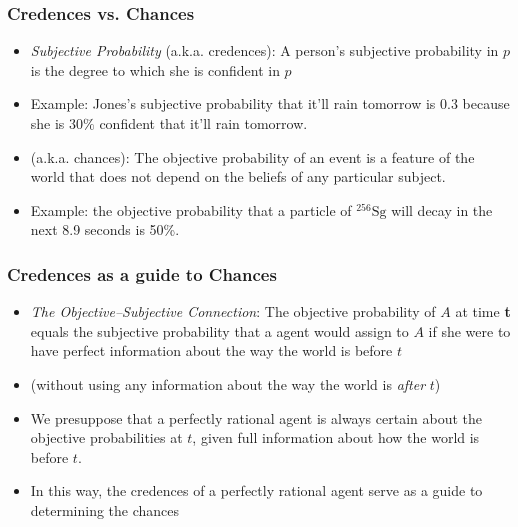 \begin{frame}
\frametitle{Credences vs. Chances}

\begin{itemize}[<+->]

\item \emph{Subjective Probability} (a.k.a. credences): A person's subjective probability in $p$ is the degree to which she is confident in $p$ %

\item[] Example: Jones's subjective probability that it'll rain tomorrow is 0.3 because she is $30\%$ confident that it'll rain tomorrow.

\item {} (a.k.a. chances): The objective probability of an event is a feature of the world that does not depend on the beliefs of any particular subject. %

\item[] Example: the objective probability that a particle of $^{256}\mbox{Sg}$ will decay in the next 8.9 seconds is 50\%.


\end{itemize}
\end{frame}

\begin{frame}
\frametitle{Credences as a guide to Chances}

\begin{itemize}[<+->]

\item \emph{The Objective--Subjective Connection}: The objective probability of $A$ at time \textbf{t} equals the subjective probability that a  agent would assign to $A$ if she were to have perfect information about the way the world is before $t$ 
\item[] (without using any information about the way the world is \textit{after} $t$)

\item[] We presuppose that a perfectly rational agent is always certain about the objective probabilities at $t$, given full information about how the world is before $t$.


\item In this way, the credences of a perfectly rational agent serve as a guide to determining the chances


\end{itemize}
\end{frame}

